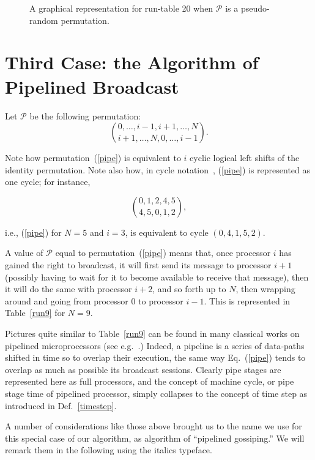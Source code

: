 \documentclass{elsart}
\begin{document}
\begin{figure}
\centerline{}
\caption{A graphical representation for run-table 20 when $\mathcal P$ is
a pseudo-random permutation.}\label{r20}
\end{figure}

\section{Third Case: the Algorithm of Pipelined Broadcast}\label{tao-pb}
Let $\mathcal P$ be the following permutation:
\begin{equation}\label{pipe}
\binom{0,\dots,i-1,i+1,\dots,N}{i+1,\dots,N,0,\dots,i-1}.
\end{equation}

Note how permutation~(\ref{pipe}) is equivalent to $i$ 
cyclic logical left shifts of the identity permutation. Note also how,
in cycle notation~\cite{Knu73a}, (\ref{pipe}) is represented as one cycle;
for instance,

\[
\binom{0,1,2,4,5}{4,5,0,1,2},
\]

i.e., (\ref{pipe}) for $N=5$ and $i=3$, is equivalent to cycle $(0,4,1,5,2)$.

A value of $\mathcal P$ equal to permutation~(\ref{pipe}) means that, once processor $i$ 
has gained the right to broadcast,
it will first send its message to processor $i+1$
(possibly having to wait for it to become available to receive that message),
then it will do the same with processor $i+2$, and so
forth up to $N$, then wrapping around and going from processor 0 to processor $i-1$.
This is represented in Table~\ref{run9} for $N=9$.

Pictures quite similar to Table~\ref{run9} can be found in many classical works
on pipelined microprocessors (see e.g.~\cite[p.132--133]{PaHe96}.)
Indeed, a pipeline is a series of data-paths shifted in time so to overlap
their execution, the same way Eq.~(\ref{pipe}) tends to overlap
as much as possible its broadcast sessions. Clearly pipe stages are represented
here as full processors, and the concept of machine cycle, or pipe stage time
of pipelined processor, simply collapses to the concept of time step as
introduced in Def.~\ref{timestep}.

A number of considerations like those above brought us to the name
we use for this special case of our algorithm, as algorithm of
``pipelined gossiping.'' We will remark them in the following
using the italics typeface.
\end{document}
